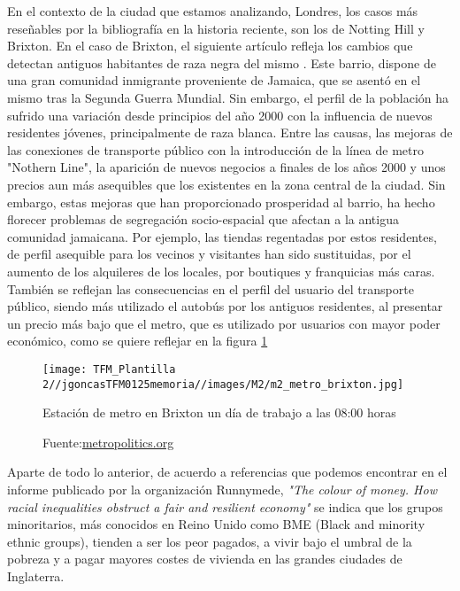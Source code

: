 \documentclass[12pt,a4paper,twoside]{book}
\begin{document}
En el contexto de la ciudad que estamos analizando, Londres, los casos más reseñables por la bibliografía en la historia reciente, son los de Notting Hill y Brixton.
En el caso de Brixton, el siguiente artículo refleja los cambios que detectan antiguos habitantes de raza negra del mismo \cite{waine_gentrification_2013}. Este barrio, dispone de una gran comunidad inmigrante proveniente de Jamaica, que se asentó en el mismo tras la Segunda Guerra Mundial. Sin embargo, el perfil de la población ha sufrido una variación desde principios del año 2000 con la influencia de nuevos residentes jóvenes, principalmente de raza blanca. Entre las causas, las mejoras de las conexiones de transporte público con la introducción de la línea de metro "Nothern Line", la aparición de nuevos negocios a finales de los años 2000 y unos precios aun más asequibles que los existentes en la zona central de la ciudad. Sin embargo, estas mejoras que han proporcionado prosperidad al barrio, ha hecho florecer problemas de segregación socio-espacial que afectan a la antigua comunidad jamaicana. Por ejemplo, las tiendas regentadas por estos residentes, de perfil asequible para los vecinos y visitantes han sido sustituidas, por el aumento de los alquileres de los locales, por boutiques y franquicias más caras. También se reflejan las consecuencias en el perfil del usuario del transporte público, siendo más utilizado el autobús por los antiguos residentes, al presentar un precio más bajo que el metro, que es utilizado por usuarios con mayor poder económico, como se quiere reflejar en la figura \ref{fig:fig_metro_brixton}

\begin{figure}
    \centering
    \texttt{[image: TFM\_Plantilla 2//jgoncasTFM0125memoria//images/M2/m2\_metro\_brixton.jpg]}
    \caption{Estación de metro en Brixton un día de trabajo a las 08:00 horas}
    \caption*{Fuente:\href{https://metropolitics.org/Gentrification-as-a-driver-of.html}{metropolitics.org}}
    \label{fig:fig_metro_brixton}
\end{figure}

Aparte de todo lo anterior, de acuerdo a referencias que podemos encontrar en el informe publicado por la organización Runnymede, \textit{"The colour of money. How racial inequalities obstruct a fair and resilient economy"} \cite{khan_colour_2020} se indica que los grupos minoritarios, más conocidos en Reino Unido como BME (Black and minority ethnic groups), tienden a ser los peor pagados, a vivir bajo el umbral de la pobreza y a pagar mayores costes de vivienda en las grandes ciudades de Inglaterra.
\end{document}
